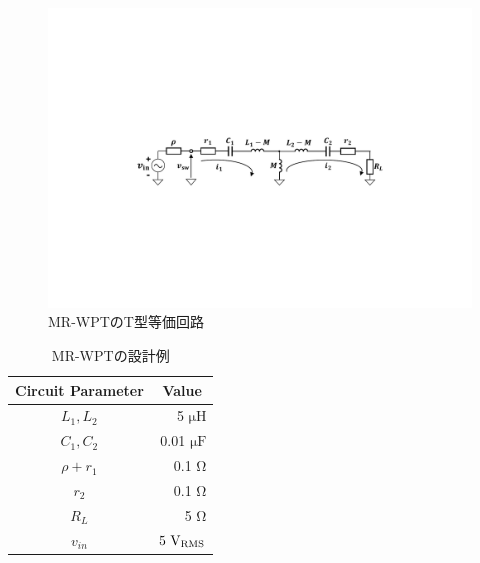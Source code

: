 \begin{figure}[b]
\begin{center}

\includegraphics[width=130mm]{figures/equivalent.pdf}
\caption{MR-WPTのT型等価回路}
\label{equivalent}
\end{center}

\end{figure}

\begin{table}[t]
\centering
\caption{MR-WPTの設計例}
\begin{tabular}{c|r}
\hline
Circuit Parameter & \multicolumn{1}{c}{Value} \\ \hline \hline
$L_1,L_2$             & 5 $ \mathrm{\mu H}$  \\ \hline
$C_1,C_2$             & 0.01 $ \mathrm{\mu F}$ \\ \hline
$\rho+r_1$           & 0.1 $ \mathrm{\Omega}$ \\ \hline
$r_2$           & 0.1 $ \mathrm{\Omega}$ \\ \hline
$R_L$                 & 5 $ \mathrm{\Omega}$ \\ \hline
$v_{in}$               & $5\ \rm V_{\rm RMS}$ \\ \hline
\end{tabular}
\end{table}

